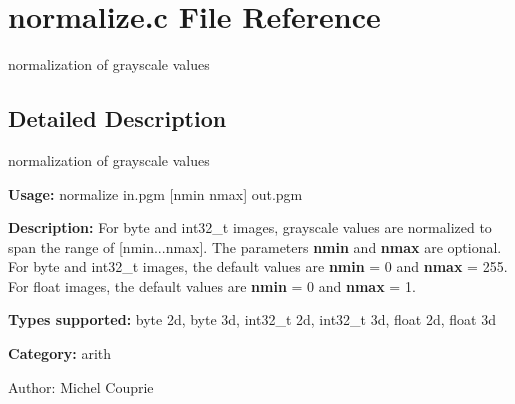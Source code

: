 \section{normalize.c File Reference}
\label{normalize_8c}
normalization of grayscale values 



\subsection{Detailed Description}
normalization of grayscale values 

{\bf Usage:} normalize in.pgm [nmin nmax] out.pgm

{\bf Description:} For byte and int32\_\-t images, grayscale values are normalized to span the range of [nmin...nmax]. The parameters {\bf nmin} and {\bf nmax} are optional. For byte and int32\_\-t images, the default values are {\bf nmin} = 0 and {\bf nmax} = 255. For float images, the default values are {\bf nmin} = 0 and {\bf nmax} = 1.

{\bf Types supported:} byte 2d, byte 3d, int32\_\-t 2d, int32\_\-t 3d, float 2d, float 3d

{\bf Category:} arith

\begin{Desc}
\item[Author:]Michel Couprie \end{Desc}
